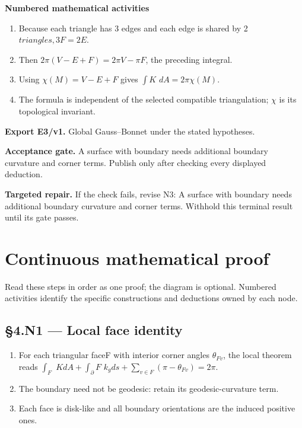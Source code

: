 \documentclass[preprint,12pt,aps,pra,showkeys,amsmath,amssymb,superscriptaddress,floatfix]{revtex4-2}
\theoremstyle{definition}
\theoremstyle{remark}
\newcommand{\field}[2]{\par\smallskip\noindent\textbf{#1.} #2\par}
\begin{document}
\smallskip\noindent\textbf{Numbered mathematical activities}

\begin{enumerate}[label=N3.\arabic*,leftmargin=3.4em]

\item Because each triangle has 3 edges and each edge is shared by 2
\(triangles,3F=2E\).

\item Then \(2\pi (V-E+F)=2\pi V-\pi F\), the preceding integral.

\item Using \(\chi (M)=V-E+F\) gives \(\int K\) \(dA=2\pi \chi (M)\).

\item The formula is independent of the selected compatible triangulation;
\(\chi\) is its topological invariant.

\end{enumerate}

\field{Export E3/v1}{Global Gauss--Bonnet under the stated hypotheses.}

\field{Acceptance gate}{A surface with boundary needs additional boundary curvature and corner
terms. Publish only after checking every displayed deduction.}

\field{Targeted repair}{If the check fails, revise N3: A surface with boundary needs additional
boundary curvature and corner terms. Withhold this terminal result until
its gate passes.}

\endgroup\clearpage\section{Continuous mathematical proof}\label{sec:proof}

Read these steps in order as one proof; the diagram is optional.
Numbered activities identify the specific constructions and deductions
owned by each node.

\subsection{§4.N1 --- Local face identity}\label{n1-local-face-identity}

\begin{enumerate}
\def\labelenumi{\arabic{enumi}.}
\item
  For each triangular faceF with interior corner angles
  \(\theta _{Fv}\), the local theorem reads \(\int _F\)
  \(KdA+\int _\partial F\)
  \(k_gds+\sum _{v\in F}(\pi -\theta _{Fv})=2\pi\).
\item
  The boundary need not be geodesic: retain its geodesic-curvature term.
\item
  Each face is disk-like and all boundary orientations are the induced
  positive ones.
\end{enumerate}
\end{document}
